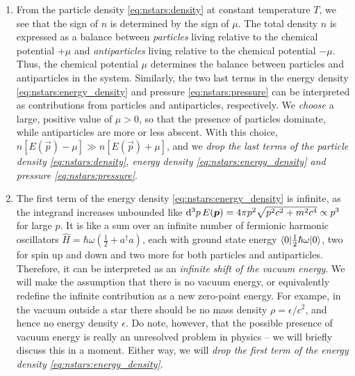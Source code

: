 \begin{enumerate}

\item
From the particle density \eqref{eq:nstars:density} at constant temperature $T$, we see that the sign of $n$ is determined by the sign of $\mu$.
The total density $n$ is expressed as a balance between \emph{particles} living relative to the chemical potential $+\mu$ and \emph{antiparticles} living relative to the chemical potential $-\mu$.
Thus, the chemical potential $\mu$ determines the balance between particles and antiparticles in the system.
Similarly, the two last terms in the energy density \eqref{eq:nstars:energy_density} and pressure \eqref{eq:nstars:pressure} can be interpreted as contributions from particles and antiparticles, respectively.
We \emph{choose} a large, positive value of $\mu > 0$, so that the presence of particles dominate, while antiparticles are more or less abscent.
With this choice, $n \left[ E(\vec{p}) - \mu \right] \gg n \left[ E(\vec{p}) + \mu \right]$, and we \emph{drop the last terms of the particle density \eqref{eq:nstars:density}, energy density \eqref{eq:nstars:energy_density} and pressure \eqref{eq:nstars:pressure}}.

\item
The first term of the energy density \eqref{eq:nstars:energy_density} is infinite, as the integrand increases unbounded like $\mathop{}\!\mathrm{d}^3 p \, E({\bm{p}}) = 4 \pi p^2 \sqrt{p^2 c^2 + m^2 c^4} \propto p^3$ for large $p$.
It is like a sum over an infinite number of fermionic harmonic oscillators $\hat{H} = \hbar \omega \left( \frac12 + a^\dagger a \right)$, each with ground state energy $\braket{0 | \frac12 \hbar \omega | 0}$, two for spin up and down and two more for both particles and antiparticles.
Therefore, it can be interpreted as an \emph{infinite shift of the vacuum energy}.
We will make the assumption that there is no vacuum energy, or equivalently redefine the infinite contribution as a new zero-point energy.
For exampe, in the vacuum outside a star there should be no mass density $\rho = \epsilon / c^2$, and hence no energy density $\epsilon$.
Do note, however, that the possible presence of vacuum energy is really an unresolved problem in physics -- we will briefly discuss this in a moment.
Either way, we will \emph{drop the first term of the energy density \eqref{eq:nstars:energy_density}}.


\end{enumerate}
